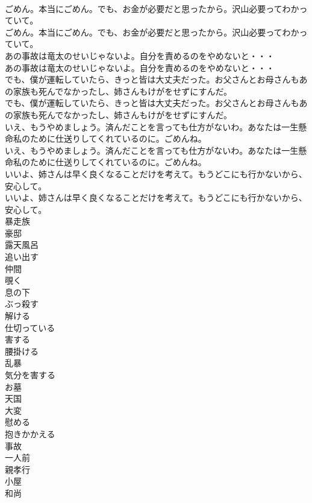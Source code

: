 \documentclass[8pt]{extreport}
\begin{document}
\begin{CJK}{UTF8}{min}
\\	ごめん。本当にごめん。でも、お金が必要だと思ったから。沢山必要ってわかっていて。	
\\	ごめん。本当にごめん。でも、お金が必要だと思ったから。沢山必要ってわかっていて。 
\\	あの事故は竜太のせいじゃないよ。自分を責めるのをやめないと・・・	
\\	あの事故は竜太のせいじゃないよ。自分を責めるのをやめないと・・・ 
\\	でも、僕が運転していたら、きっと皆は大丈夫だった。お父さんとお母さんもあの家族も死んでなかったし、姉さんもけがをせずにすんだ。	
\\	でも、僕が運転していたら、きっと皆は大丈夫だった。お父さんとお母さんもあの家族も死んでなかったし、姉さんもけがをせずにすんだ。 
\\	いえ、もうやめましょう。済んだことを言っても仕方がないわ。あなたは一生懸命私のために仕送りしてくれているのに。ごめんね。	
\\	いえ、もうやめましょう。済んだことを言っても仕方がないわ。あなたは一生懸命私のために仕送りしてくれているのに。ごめんね。 
\\	いいよ、姉さんは早く良くなることだけを考えて。もうどこにも行かないから、安心して。	
\\	いいよ、姉さんは早く良くなることだけを考えて。もうどこにも行かないから、安心して。 
\\	暴走族
\\	豪邸
\\	露天風呂
\\	追い出す
\\	仲間
\\	覗く
\\	息の下
\\	ぶっ殺す
\\	解ける
\\	仕切っている
\\	害する
\\	腰掛ける
\\	乱暴
\\	気分を害する
\\	お墓
\\	天国
\\	大変
\\	慰める
\\	抱きかかえる
\\	事故
\\	一人前
\\	親孝行
\\	小屋
\\	和尚

\end{CJK}
\end{document}
